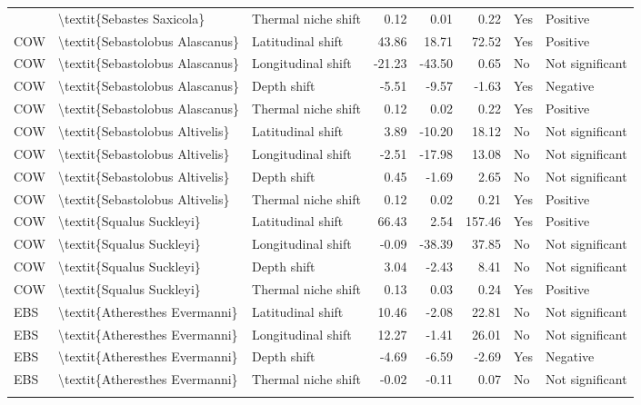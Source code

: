 \begin{longtable}[t]{lllrrrll}
{{COW & \textbackslash{}textit\{Sebastes Saxicola\} & Thermal niche shift & 0.12 & 0.01 & 0.22 & Yes & Positive\\
\addlinespace
COW & \textbackslash{}textit\{Sebastolobus Alascanus\} & Latitudinal shift & 43.86 & 18.71 & 72.52 & Yes & Positive\\
COW & \textbackslash{}textit\{Sebastolobus Alascanus\} & Longitudinal shift & -21.23 & -43.50 & 0.65 & No & Not significant\\
COW & \textbackslash{}textit\{Sebastolobus Alascanus\} & Depth shift & -5.51 & -9.57 & -1.63 & Yes & Negative\\
COW & \textbackslash{}textit\{Sebastolobus Alascanus\} & Thermal niche shift & 0.12 & 0.02 & 0.22 & Yes & Positive\\
COW & \textbackslash{}textit\{Sebastolobus Altivelis\} & Latitudinal shift & 3.89 & -10.20 & 18.12 & No & Not significant\\
\addlinespace
COW & \textbackslash{}textit\{Sebastolobus Altivelis\} & Longitudinal shift & -2.51 & -17.98 & 13.08 & No & Not significant\\
COW & \textbackslash{}textit\{Sebastolobus Altivelis\} & Depth shift & 0.45 & -1.69 & 2.65 & No & Not significant\\
COW & \textbackslash{}textit\{Sebastolobus Altivelis\} & Thermal niche shift & 0.12 & 0.02 & 0.21 & Yes & Positive\\
COW & \textbackslash{}textit\{Squalus Suckleyi\} & Latitudinal shift & 66.43 & 2.54 & 157.46 & Yes & Positive\\
COW & \textbackslash{}textit\{Squalus Suckleyi\} & Longitudinal shift & -0.09 & -38.39 & 37.85 & No & Not significant\\
\addlinespace
COW & \textbackslash{}textit\{Squalus Suckleyi\} & Depth shift & 3.04 & -2.43 & 8.41 & No & Not significant\\
COW & \textbackslash{}textit\{Squalus Suckleyi\} & Thermal niche shift & 0.13 & 0.03 & 0.24 & Yes & Positive\\
EBS & \textbackslash{}textit\{Atheresthes Evermanni\} & Latitudinal shift & 10.46 & -2.08 & 22.81 & No & Not significant\\
EBS & \textbackslash{}textit\{Atheresthes Evermanni\} & Longitudinal shift & 12.27 & -1.41 & 26.01 & No & Not significant\\
EBS & \textbackslash{}textit\{Atheresthes Evermanni\} & Depth shift & -4.69 & -6.59 & -2.69 & Yes & Negative\\
\addlinespace
EBS & \textbackslash{}textit\{Atheresthes Evermanni\} & Thermal niche shift & -0.02 & -0.11 & 0.07 & No & Not significant\\
}}
\end{longtable}
